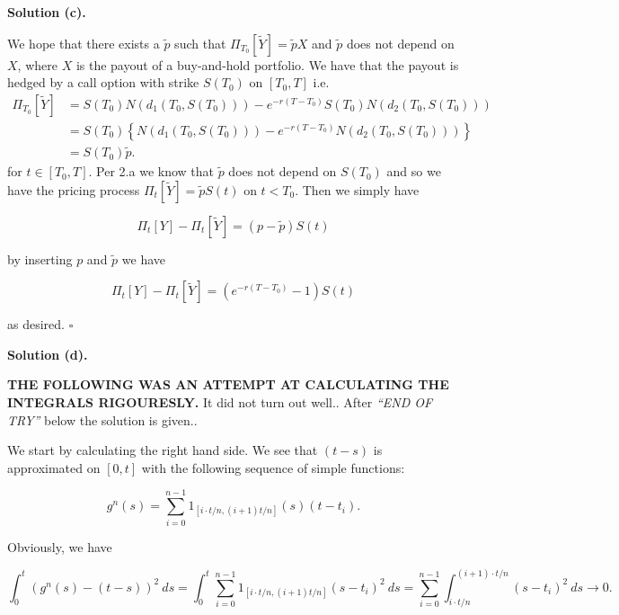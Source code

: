 \documentclass[a4paper,12pt,openany]{book}
\begin{document}
\noindent\makebox[\linewidth]{\rule{\textwidth}{0.4pt}}

\textbf{Solution (c).}

We hope that there exists a \(\tilde{p}\) such that \(\Pi_{T_0}[\widetilde{Y}]=\tilde{p}X\) and \(\tilde{p}\) does not depend on \(X\), where \(X\) is the payout of a buy-and-hold portfolio. We have that the payout is hedged by a call option with strike \(S(T_0)\) on \([T_0,T]\) i.e.
\begin{align*}
\Pi_{T_0}[\widetilde{Y}]&=S(T_0)N(d_1(T_0,S(T_0)))-e^{-r(T-T_0)}S(T_0)N(d_2(T_0,S(T_0)))\\
&=S(T_0)\left\{N(d_1(T_0,S(T_0)))-e^{-r(T-T_0)}N(d_2(T_0,S(T_0)))\right\}\\
&=S(T_0)\tilde{p}.
\end{align*}
for \(t\in[T_0,T]\). Per 2.a we know that \(\tilde{p}\) does not depend on \(S(T_0)\) and so we have the pricing process \(\Pi_t[\widetilde{Y}]=\tilde{p}S(t)\) on \(t<T_0\). Then we simply have

\[
\Pi_t[Y]-\Pi_t[\widetilde{Y}]=(p-\tilde{p})S(t)
\]

by inserting \(p\) and \(\tilde{p}\) we have

\[
\Pi_t[Y]-\Pi_t[\widetilde{Y}]=(e^{-r(T-T_0)}-1)S(t)
\]

as desired. \(\square\)

\noindent\makebox[\linewidth]{\rule{\textwidth}{0.4pt}}

\textbf{Solution (d).}

\textbf{THE FOLLOWING WAS AN ATTEMPT AT CALCULATING THE INTEGRALS RIGOURESLY.} It did not turn out well.. After \emph{``END OF TRY''} below the solution is given..

We start by calculating the right hand side. We see that \((t-s)\) is approximated on \([0,t]\) with the following sequence of simple functions:

\[
g^n(s)=\sum_{i=0}^{n-1}1_{[i\cdot t/n,(i+1)t/n]}(s)(t-t_i).
\]

Obviously, we have

\[
\int_0^t(g^n(s)-(t-s))^2\ ds=\int_0^t \sum_{i=0}^{n-1}1_{[i\cdot t/n,(i+1)t/n]}(s-t_i)^2\ ds=\sum_{i=0}^{n-1}\int_{i\cdot t/n}^{(i+1)\cdot t/n}(s-t_i)^2\ ds\to 0.
\]
\end{document}
